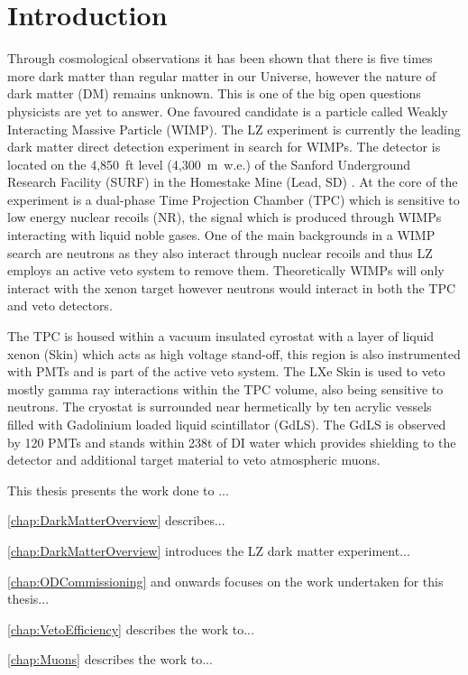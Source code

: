 \chapter{Introduction}
Through cosmological observations it has been shown that there is five times more dark matter than regular matter in our Universe, however the nature of dark matter (DM) remains unknown. This is one of the big open questions physicists are yet to answer. One favoured candidate is a particle called Weakly Interacting Massive Particle (WIMP). The LZ experiment is currently the leading dark matter direct detection experiment in search for WIMPs. The detector is located on the 4,850~ft level (4,300~m~w.e.) of the Sanford Underground Research Facility (SURF) in the Homestake Mine (Lead, SD) \cite{LZNIMA}. At the core of the experiment is a dual-phase Time Projection Chamber (TPC) which is sensitive to low energy nuclear recoils (NR), the signal which is produced through WIMPs interacting with liquid noble gases. One of the main backgrounds in a WIMP search are neutrons as they also interact through nuclear recoils and thus LZ employs an active veto system to remove them. Theoretically WIMPs will only interact with the xenon target however neutrons would interact in both the TPC and veto detectors.

The TPC is housed within a vacuum insulated cyrostat with a layer of liquid xenon (Skin) which acts as high voltage stand-off, this region is also instrumented with PMTs and is part of the active veto system. The LXe Skin is used to veto mostly gamma ray interactions within the TPC volume, also being sensitive to neutrons. The cryostat is surrounded near hermetically by ten acrylic vessels filled with  Gadolinium loaded liquid scintillator (GdLS). The GdLS is observed by 120 PMTs and stands within 238t of DI water which provides shielding to the detector and additional target material to veto atmospheric muons.

This thesis presents the work done to ...

\autoref{chap:DarkMatterOverview} describes...

\autoref{chap:DarkMatterOverview} introduces the LZ dark matter experiment...

\autoref{chap:ODCommissioning} and onwards focuses on the work undertaken for this thesis...

\autoref{chap:VetoEfficiency} describes the work to...

\autoref{chap:Muons} describes the work to...
